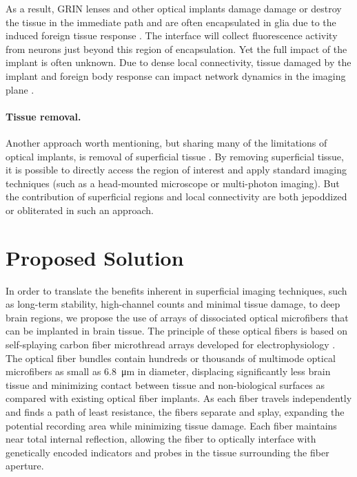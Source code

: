 As a result, GRIN lenses and other optical implants damage 
damage or destroy the tissue in the immediate path and 
are often encapsulated in glia due to the induced foreign 
tissue response \cite{Lee:2016ko}. The interface will 
collect fluorescence activity from neurons just beyond this 
region of encapsulation. Yet the full impact of the implant 
is often unknown. Due to dense local connectivity, tissue 
damaged by the implant and foreign body response can impact 
network dynamics in the imaging plane 
\cite{Hayn:2015ew,Hayn:2017kj,GossVarley:2017kf}.

\paragraph{Tissue removal.} Another approach worth mentioning, 
but sharing many of the limitations of optical implants, is 
removal of superficial tissue \cite{Dombeck:2010jr}. By 
removing superficial tissue, it is possible to directly access 
the region of interest and apply standard imaging techniques 
(such as a head-mounted microscope or multi-photon imaging). 
But the contribution of superficial regions and local connectivity 
are both jepoddized or obliterated in such an approach.

\section{Proposed Solution}

In order to translate the benefits inherent in superficial 
imaging techniques, such as long-term stability, high-channel 
counts and minimal tissue damage, to deep brain regions, we 
propose the use of arrays of dissociated optical microfibers 
that can be implanted in brain tissue. The principle of these 
optical fibers is based on self-splaying carbon fiber microthread 
arrays developed for electrophysiology 
\cite{Guitchounts:2013bs,Markowitz:2015ko}. The optical fiber 
bundles contain hundreds or thousands of multimode 
optical microfibers as small as 6.8~\si{\micro\meter} in diameter, 
displacing significantly less brain tissue and minimizing 
contact between tissue and non-biological surfaces as 
compared with existing optical fiber implants. As each 
fiber travels independently and finds a path of least 
resistance, the fibers separate and splay, expanding 
the potential recording area while minimizing tissue 
damage. Each fiber maintains near total internal reflection, 
allowing the fiber to optically interface with genetically 
encoded indicators and probes in the tissue surrounding the 
fiber aperture.

